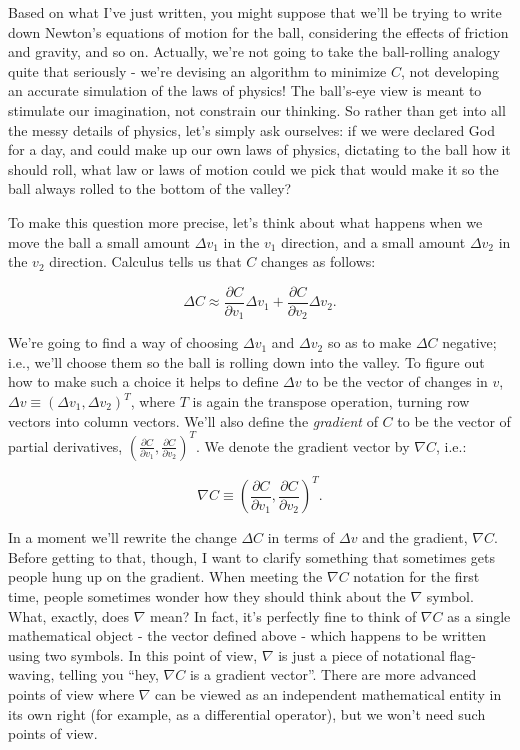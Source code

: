 Based on what I've just written, you might suppose that we'll be trying to write down Newton's equations of motion for the ball, considering the effects of friction and gravity, and so on. Actually, we're not going to take the ball-rolling analogy quite that seriously - we're devising an algorithm to minimize $C$, not developing an accurate simulation of the laws of physics! The ball's-eye view is meant to stimulate our imagination, not constrain our thinking. So rather than get into all the messy details of physics, let's simply ask ourselves: if we were declared God for a day, and could make up our own laws of physics, dictating to the ball how it should roll, what law or laws of motion could we pick that would make it so the ball always rolled to the bottom of the valley?


To make this question more precise, let's think about what happens when we move the ball a small amount $\Delta v_1$ in the $v_1$ direction, and a small amount $\Delta v_2$ in the $v_2$ direction. Calculus tells us that $C$ changes as follows:

\begin{equation}
\Delta C \approx \frac{\partial C}{\partial v_1} \Delta v_1 + \frac{\partial C}{\partial v_2} \Delta v_2.
\tag{7}
\end{equation}

\noindent We're going to find a way of choosing $\Delta v_1$ and $\Delta v_2$ so as to make $\Delta C$ negative; i.e., we'll choose them so the ball is rolling down into the valley. To figure out how to make such a choice it helps to define $\Delta v$ to be the vector of changes in $v$, $\Delta v \equiv (\Delta v_1, \Delta v_2)^T$, where $T$ is again the transpose operation, turning row vectors into column vectors. We'll also define the \emph{gradient} of $C$ to be the vector of partial derivatives, $\left(\frac{\partial C}{\partial v_1}, \frac{\partial C}{\partial v_2}\right)^T$. We denote the gradient vector by $\nabla C$, i.e.:

\begin{equation}
\nabla C \equiv \left( \frac{\partial C}{\partial v_1}, \frac{\partial C}{\partial v_2} \right)^T.
\tag{8}
\end{equation}

\noindent In a moment we'll rewrite the change $\Delta C$ in terms of $\Delta v$ and the gradient, $\nabla C$. Before getting to that, though, I want to clarify something that sometimes gets people hung up on the gradient. When meeting the $\nabla C$ notation for the first time, people sometimes wonder how they should think about the $\nabla$ symbol. What, exactly, does $\nabla$ mean? In fact, it's perfectly fine to think of $\nabla C$ as a single mathematical object - the vector defined above - which happens to be written using two symbols. In this point of view, $\nabla$ is just a piece of notational flag-waving, telling you ``hey, $\nabla C$ is a gradient vector''. There are more advanced points of view where $\nabla$ can be viewed as an independent mathematical entity in its own right (for example, as a differential operator), but we won't need such points of view.


